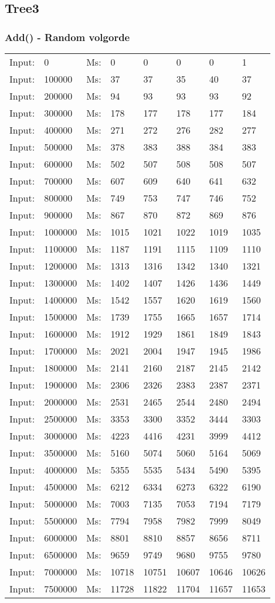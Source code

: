 \documentclass[11pt,a4paper]{report}
\begin{document}
\begin{tiny}
\subsection*{Tree3}
\subsubsection*{Add() - Random volgorde}
\begin{tabular}{l l ||l  l  l  l  l  l}
Input:&0&Ms:&0&0&0&0&1\\
Input:&100000&Ms:&37&37&35&40&37\\
Input:&200000&Ms:&94&93&93&93&92\\
Input:&300000&Ms:&178&177&178&177&184\\
Input:&400000&Ms:&271&272&276&282&277\\
Input:&500000&Ms:&378&383&388&384&383\\
Input:&600000&Ms:&502&507&508&508&507\\
Input:&700000&Ms:&607&609&640&641&632\\
Input:&800000&Ms:&749&753&747&746&752\\
Input:&900000&Ms:&867&870&872&869&876\\
Input:&1000000&Ms:&1015&1021&1022&1019&1035\\
Input:&1100000&Ms:&1187&1191&1115&1109&1110\\
Input:&1200000&Ms:&1313&1316&1342&1340&1321\\
Input:&1300000&Ms:&1402&1407&1426&1436&1449\\
Input:&1400000&Ms:&1542&1557&1620&1619&1560\\
Input:&1500000&Ms:&1739&1755&1665&1657&1714\\
Input:&1600000&Ms:&1912&1929&1861&1849&1843\\
Input:&1700000&Ms:&2021&2004&1947&1945&1986\\
Input:&1800000&Ms:&2141&2160&2187&2145&2142\\
Input:&1900000&Ms:&2306&2326&2383&2387&2371\\
Input:&2000000&Ms:&2531&2465&2544&2480&2494\\
Input:&2500000&Ms:&3353&3300&3352&3444&3303\\
Input:&3000000&Ms:&4223&4416&4231&3999&4412\\
Input:&3500000&Ms:&5160&5074&5060&5164&5069\\
Input:&4000000&Ms:&5355&5535&5434&5490&5395\\
Input:&4500000&Ms:&6212&6334&6273&6322&6190\\
Input:&5000000&Ms:&7003&7135&7053&7194&7179\\
Input:&5500000&Ms:&7794&7958&7982&7999&8049\\
Input:&6000000&Ms:&8801&8810&8857&8656&8711\\
Input:&6500000&Ms:&9659&9749&9680&9755&9780\\
Input:&7000000&Ms:&10718&10751&10607&10646&10626\\
Input:&7500000&Ms:&11728&11822&11704&11657&11653\\
\end{tabular}


\end{tiny}
\end{document}
